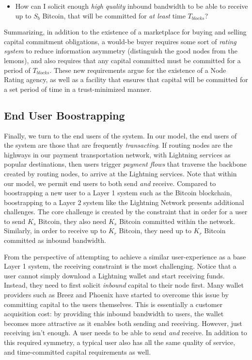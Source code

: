 \documentclass[10pt,a4paper]{article}
\theoremstyle{definition}
\begin{document}
\begin{itemize}
        \item How can I solicit enough \emph{high quality} inbound bandwidth
             to be able to receive up to $S_b$ Bitcoin, that
            will be committed for \emph{at least} time $T_{blocks}$?
\end{itemize}

Summarizing, in addition to the existence of a marketplace for buying and
selling capital commitment obligations, a would-be buyer requires some sort of
\emph{rating system} to reduce information asymmetry (distinguish the good
nodes from the lemons), and also requires that any capital committed must be
committed for a period of $T_{blocks}$. These new requirements argue for the
existence of a Node Rating agency, as well as a facility that ensures that
capital will be committed for a set period of time in a trust-minimized manner.


\subsection{End User Boostrapping}

Finally, we turn to the end users of the system. In our model, the end users of
the system are those that are frequently \emph{transacting}. If routing nodes
are the highways in our payment transportation network, with Lightning
services as popular destinations, then users trigger \emph{payment flows} that
traverse the backbone created by routing nodes, to arrive at the Lightning
services. Note that within our model, we permit end users to both send
\emph{and} receive. Compared to boostrapping a new user to a Layer 1 system
such as the Bitcoin blockchain, boostrapping to a Layer 2 system like the
Lightning Network presents additional challenges. The core challenge is created
by the constraint that in order for a user to send $K_s$ Bitcoin, they also
need $K_s$ Bitcoin committed within the network. Similarly, in order to receive
up to $K_r$ Bitcoin, they need up to $K_r$ Bitcoin committed as inbound
bandwidth.

From the perspective of attempting to achieve a similar user-experience as a
base Layer 1 system, the receiving constraint is the most challenging. Notice
that a user cannot simply download a Lightning wallet and start receiving
funds. Instead, they need to first solicit \emph{inbound} capital to their node
first. Many wallet providers such as Breez and Phoenix have started to overcome
this issue by committing capital to the users themselves. This is essentially a
customer acquisition cost: by providing this inbound bandwidth to users, the
wallet becomes more attractive as it enables both sending and receiving.
However, just receiving isn't enough.  A user needs to be able to send
\emph{and} receive. In addition to this required symmetry, a typical user also
has all the same quality of service, and time-committed capital requirements as
well.
\end{document}
